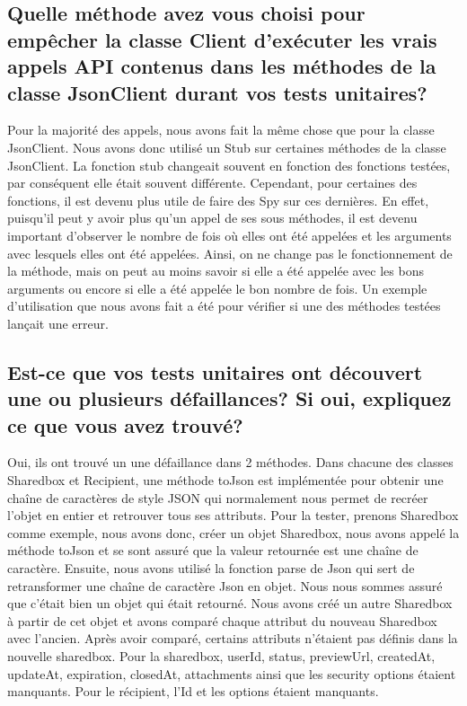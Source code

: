 \documentclass{article}
\begin{document}
\subsection*{Quelle méthode avez vous choisi pour empêcher la classe Client d’exécuter les
  vrais appels API contenus dans les méthodes de la classe JsonClient durant
  vos tests unitaires?}
	Pour la majorité des appels, nous avons fait la même chose que pour la classe JsonClient.
	Nous avons donc utilisé un Stub sur certaines méthodes de la classe JsonClient.
	La fonction stub changeait souvent en fonction des fonctions testées, par conséquent elle était souvent différente.
	Cependant, pour certaines des fonctions, il est devenu plus utile de faire des Spy sur ces dernières.
	En effet, puisqu'il peut y avoir plus qu'un appel de ses sous méthodes, il est devenu important d'observer le nombre de fois où elles ont été appelées et les arguments avec lesquels elles ont été appelées.
	Ainsi, on ne change pas le fonctionnement de la méthode, mais on peut au moins savoir si elle a été appelée avec les bons arguments ou encore si elle a été appelée le bon nombre de fois.
	Un exemple d'utilisation que nous avons fait a été pour vérifier si une des méthodes testées lançait une erreur.
\subsection*{Est-ce que vos tests unitaires ont découvert une ou plusieurs défaillances? Si oui,
  expliquez ce que vous avez trouvé?}
	Oui, ils ont trouvé un une défaillance dans 2 méthodes.
	Dans chacune des classes Sharedbox et Recipient, une méthode toJson est implémentée pour obtenir une chaîne de caractères de style JSON qui normalement nous permet de recréer l'objet en entier et retrouver tous ses attributs.
	Pour la tester, prenons Sharedbox comme exemple, nous avons donc, créer un objet Sharedbox, nous avons appelé la méthode toJson et se sont assuré que la valeur retournée est une chaîne de caractère.
	Ensuite, nous avons utilisé la fonction parse de Json qui sert de retransformer une chaîne de caractère Json en objet.
	Nous nous sommes assuré que c'était bien un objet qui était retourné.
	Nous avons créé un autre Sharedbox à partir de cet objet et avons comparé chaque attribut du nouveau Sharedbox avec l'ancien.
	Après avoir comparé, certains attributs n'étaient pas définis dans la nouvelle sharedbox.
	Pour la sharedbox, userId, status, previewUrl, createdAt, updateAt, expiration, closedAt, attachments ainsi que les security options étaient manquants.
	Pour le récipient, l'Id et les options étaient manquants.
\end{document}
